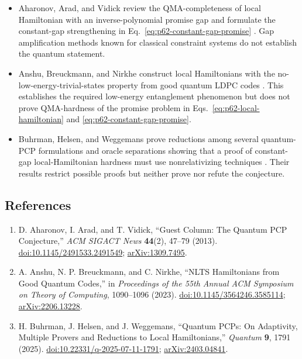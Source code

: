 \begin{itemize}
  \item Aharonov, Arad, and Vidick review the QMA-completeness of local
  Hamiltonian with an inverse-polynomial promise gap and formulate the
  constant-gap strengthening in
  Eq.~\eqref{eq:p62-constant-gap-promise}
  .  Gap amplification methods known for
  classical constraint systems do not establish the quantum statement.

  \item Anshu, Breuckmann, and Nirkhe construct local Hamiltonians with the
  no-low-energy-trivial-states property from good quantum LDPC codes
  .  This establishes the required
  low-energy entanglement phenomenon but does not prove QMA-hardness of the
  promise problem in Eqs.~\eqref{eq:p62-local-hamiltonian} and
  \eqref{eq:p62-constant-gap-promise}.

  \item Buhrman, Helsen, and Weggemans prove reductions among several
  quantum-PCP formulations and oracle separations showing that a proof of
  constant-gap local-Hamiltonian hardness must use nonrelativizing
  techniques .  Their results restrict
  possible proofs but neither prove nor refute the conjecture.
\end{itemize}

\subsection*{References}

\begin{enumerate}[label={},leftmargin=4.8em,labelsep=0.5em]
  \footnotesize
  \item[\textup{[AAV13]}]\label{ref:p62-aharonov}
  D. Aharonov, I. Arad, and T. Vidick,
  ``Guest Column: The Quantum PCP Conjecture,''
  \emph{ACM SIGACT News} \textbf{44}(2), 47--79 (2013).
  \href{https://doi.org/10.1145/2491533.2491549}{doi:10.1145/2491533.2491549};
  \href{https://arxiv.org/abs/1309.7495}{arXiv:1309.7495}.

  \item[\textup{[ABN23]}]\label{ref:p62-anshu}
  A. Anshu, N. P. Breuckmann, and C. Nirkhe,
  ``NLTS Hamiltonians from Good Quantum Codes,'' in
  \emph{Proceedings of the 55th Annual ACM Symposium on Theory of Computing},
  1090--1096 (2023).
  \href{https://doi.org/10.1145/3564246.3585114}{doi:10.1145/3564246.3585114};
  \href{https://arxiv.org/abs/2206.13228}{arXiv:2206.13228}.

  \item[\textup{[BHW25]}]\label{ref:p62-buhrman}
  H. Buhrman, J. Helsen, and J. Weggemans,
  ``Quantum PCPs: On Adaptivity, Multiple Provers and Reductions to Local
  Hamiltonians,'' \emph{Quantum} \textbf{9}, 1791 (2025).
  \href{https://doi.org/10.22331/q-2025-07-11-1791}{doi:10.22331/q-2025-07-11-1791};
  \href{https://arxiv.org/abs/2403.04841}{arXiv:2403.04841}.
\end{enumerate}

